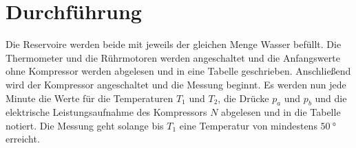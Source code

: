 \section{Durchführung}
\label{sec:Durchführung}

Die Reservoire werden beide mit jeweils der gleichen Menge Wasser befüllt.
Die Thermometer und die Rührmotoren werden angeschaltet und die Anfangswerte ohne Kompressor werden abgelesen und in eine Tabelle geschrieben.
Anschließend wird der Kompressor angeschaltet und die Messung beginnt.
Es werden nun jede Minute die Werte für die Temperaturen $T_1$ und $T_2$, die Drücke $p_a$ und $p_b$ und die elektrische Leistungsaufnahme
des Kompressors $N$ abgelesen und in die Tabelle notiert. Die Messung geht solange bis $T_1$ eine Temperatur von mindestens $\qty{50}{\degree}$ erreicht.
